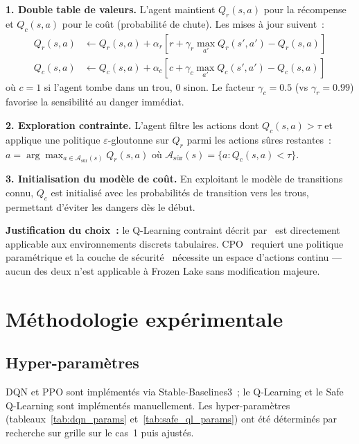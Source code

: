 \documentclass{article}
\begin{document}
\textbf{1. Double table de valeurs.} L'agent maintient $Q_r(s,a)$ pour la récompense et $Q_c(s,a)$ pour le coût (probabilité de chute). Les mises à jour suivent~:
\begin{align}
Q_r(s,a) &\leftarrow Q_r(s,a) + \alpha_r \left[ r + \gamma_r \max_{a'} Q_r(s', a') - Q_r(s,a) \right] \\
Q_c(s,a) &\leftarrow Q_c(s,a) + \alpha_c \left[ c + \gamma_c \max_{a'} Q_c(s', a') - Q_c(s,a) \right]
\end{align}
où $c = 1$ si l'agent tombe dans un trou, $0$ sinon. Le facteur $\gamma_c = 0.5$ (vs $\gamma_r = 0.99$) favorise la sensibilité au danger immédiat.

\textbf{2. Exploration contrainte.} L'agent filtre les actions dont $Q_c(s,a) > \tau$ et applique une politique $\varepsilon$-gloutonne sur $Q_r$ parmi les actions sûres restantes~: $a = \arg\max_{a \in \mathcal{A}_{\text{sûr}}(s)} Q_r(s,a)$ où $\mathcal{A}_{\text{sûr}}(s) = \{a : Q_c(s,a) < \tau\}$.

\textbf{3. Initialisation du modèle de coût.} En exploitant le modèle de transitions connu, $Q_c$ est initialisé avec les probabilités de transition vers les trous, permettant d'éviter les dangers dès le début.

\textbf{Justification du choix~:} le Q-Learning contraint décrit par~\cite{garcia2015comprehensive} est directement applicable aux environnements discrets tabulaires. CPO~\cite{achiam2017constrained} requiert une politique paramétrique et la couche de sécurité~\cite{dalal2018safe} nécessite un espace d'actions continu — aucun des deux n'est applicable à Frozen Lake sans modification majeure.


\section{Méthodologie expérimentale}

\subsection{Hyper-paramètres}

DQN et PPO sont implémentés via Stable-Baselines3~\cite{raffin2021stable}; le Q-Learning et le Safe Q-Learning sont implémentés manuellement. Les hyper-paramètres (tableaux~\ref{tab:dqn_params} et~\ref{tab:safe_ql_params}) ont été déterminés par recherche sur grille sur le cas~1 puis ajustés.
\end{document}
